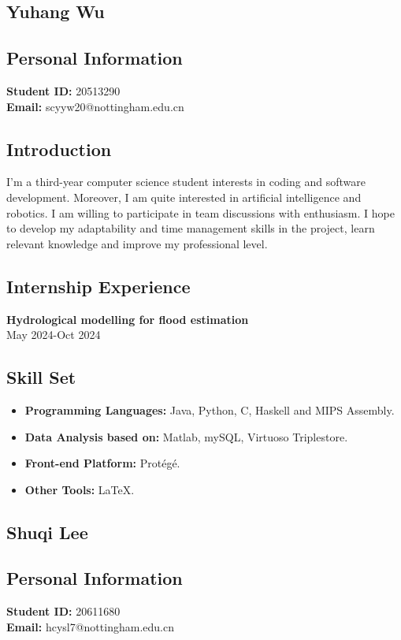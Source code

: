\documentclass[a4paper,12pt]{article}
\begin{document}
    \subsection{Yuhang Wu}
    \subsection*{Personal Information}
    \textbf{Student ID:} 20513290 \\
    \textbf{Email:} scyyw20@nottingham.edu.cn
    
    \subsection*{Introduction}
    I’m a third-year computer science student interests in coding and software development. Moreover, I am quite interested in artificial intelligence and robotics. I am willing to participate in team discussions with enthusiasm. I hope to develop my adaptability and time management skills in the project, learn relevant knowledge and improve my professional level.
    
    \subsection*{Internship Experience}
    \textbf{Hydrological modelling for flood estimation}  \\May 2024-Oct 2024
    \subsection*{Skill Set}
    \begin{itemize}
        \item \textbf{Programming Languages:} Java, Python, C, Haskell and MIPS Assembly.
        \item \textbf{Data Analysis based on:} Matlab, mySQL, Virtuoso Triplestore.
        \item \textbf{Front-end Platform:} Protégé.
        \item \textbf{Other Tools:} LaTeX.
    \end{itemize}
    \subsection{Shuqi Lee}
    \subsection*{Personal Information}
    \textbf{Student ID:} 20611680 \\
    \textbf{Email:} hcysl7@nottingham.edu.cn
    
\end{document}
